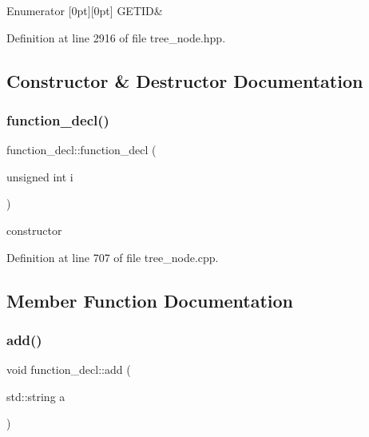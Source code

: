 \begin{DoxyEnumFields}{Enumerator}
[0pt][0pt]{}\mbox{\label{structfunction__decl_a18d627c0b2293ae1ca973fd86b1e9ca7a5b640324255e28e847b7416f6866de11}} 
G\+E\+T\+ID&\\
\hline

\end{DoxyEnumFields}


Definition at line 2916 of file tree\+\_\+node.\+hpp.



\subsection{Constructor \& Destructor Documentation}
\mbox{\label{structfunction__decl_a54c07694f58da2c3f9197aeb068d7c81}} 
\subsubsection{\texorpdfstring{function\+\_\+decl()}{function\_decl()}}
{\footnotesize\ttfamily function\+\_\+decl\+::function\+\_\+decl (\begin{DoxyParamCaption}\item[{unsigned int}]{i }\end{DoxyParamCaption})\hspace{0.3cm}{\ttfamily [explicit]}}



constructor 



Definition at line 707 of file tree\+\_\+node.\+cpp.



\subsection{Member Function Documentation}
\mbox{\label{structfunction__decl_a3cf702655bb68e0aabd56616c1f17fc2}} 
\subsubsection{\texorpdfstring{add()}{add()}}
{\footnotesize\ttfamily void function\+\_\+decl\+::add (\begin{DoxyParamCaption}\item[{std\+::string}]{a }\end{DoxyParamCaption})\hspace{0.3cm}{\ttfamily [inline]}}



